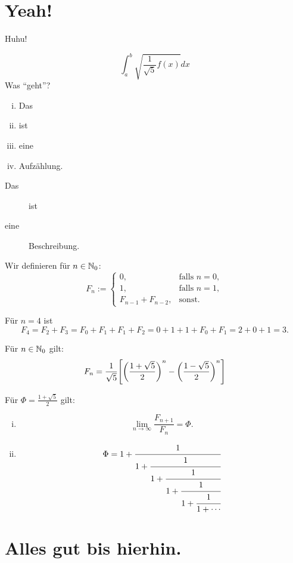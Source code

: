 \section{Yeah!}
Huhu! 

\[
	\int_{a}^{b} \sqrt{\frac{1}{\sqrt{5}} f(x)} dx
\]
Was \enquote{geht}? 

\begin{enumerate}[(i)]
	\item Das
	\item ist 
	\item eine
	\item Aufzählung.
\end{enumerate}

\begin{description}
	\item[Das] ist
	\item[eine] Beschreibung.
\end{description}

\begin{definition}
	Wir definieren für $n \in \mathbb{N}_0$:
	\[
		F_n := \begin{cases}
			0, & \text{falls } n = 0, \\
			1, & \text{falls } n = 1, \\
			F_{n-1} + F_{n-2}, & \text{sonst.}
		\end{cases}
	\]
\end{definition}

\begin{beispiel}
	Für $n = 4$ ist
	\[
		F_4 = F_2 + F_3 = F_0 + F_1 + F_1 + F_2 = 0 + 1 + 1 + F_0 + F_1 = 2 + 0 + 1 = 3.
	\]
\end{beispiel}

\begin{satz}
	Für $n \in \mathbb{N}_0$ gilt:
	\[
		F_n = \frac{1}{\sqrt{5}} \benb{ \enb{\frac{1+\sqrt{5}}{2}}^n - \enb{\frac{1-\sqrt{5}}{2}}^n}
	\]
\end{satz}

\begin{korollar}
	Für $\Phi = \frac{1+\sqrt{5}}{2}$ gilt:
	\begin{enumerate}[(i)]
		\item \[
			\lim\limits_{n \rightarrow \infty} \frac{F_{n+1}}{F_n} = \Phi.
		\]
		\item \[
			\Phi = 1 + \cfrac{1}{1+ \cfrac{1}{1 + \cfrac{1}{1 + \cfrac{1}{1 + \cfrac{1}{1 + \cdots}}}}}
		\]
	\end{enumerate}
\end{korollar}
\lipsum

\section{Alles gut bis hierhin.}